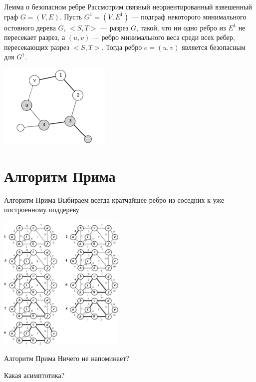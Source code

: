 \documentclass[10pt]{beamer}
\begin{document}
\begin{frame}[fragile]{Лемма о безопасном ребре}
Рассмотрим связный неориентированный взвешенный граф $G=(V,E)$. Пусть $G^1=(V,E^1)$ — подграф некоторого минимального остовного дерева $G$, $<S,T>$ — разрез $G$, такой, что ни одно ребро из $E^1$ не пересекает разрез, а $(u,v)$ — ребро минимального веса среди всех ребер, пересекающих разрез $<S,T>$. Тогда ребро $e=(u,v)$ является безопасным для $G^1$.
\begin{center}
\includegraphics[height=4cm]{Term_2/Source/images/safe_lemma.png}
\end{center}
\end{frame}

\section{Алгоритм Прима}
\begin{frame}[fragile]{Алгоритм Прима}
Выбираем всегда кратчайшее ребро из соседних к уже построенному поддереву
\begin{center}
\includegraphics[height=6.5cm]{Term_2/Source/images/prim.png}
\end{center}
\end{frame}

\begin{frame}[fragile]{Алгоритм Прима}
Ничего не напоминает?

Какая асимптотика?
\end{frame}
\end{document}

